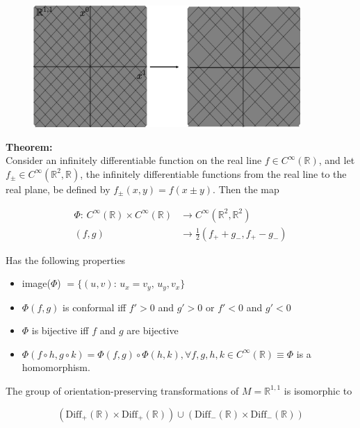 \begin{figure}[H]
	\centering
	\includegraphics[width=4in]{images/conf_trans_lightcone.png} 
\end{figure} 

\noindent \textbf{Theorem:} \\

\noindent Consider an infinitely differentiable function on the real line $f \in C^\infty (\mathbb{R})$, and let $f_\pm \in C^\infty (\mathbb{R}^2, \mathbb{R})$, the infinitely differentiable functions from the real line to the real plane, be defined by $f_\pm (x,y) = f(x \pm y)$. Then the map 

\begin{align}
\Phi: \, C^\infty (\mathbb{R}) \times C^\infty (\mathbb{R}) &\rightarrow C^\infty (\mathbb{R}^2, \mathbb{R}^2) \\
(f,g) &\rightarrow \frac{1}{2} (f_+ + g_-, f_+ - g_- )
\end{align}

\noindent Has the following properties

\begin{itemize}
\item image($\Phi$) $= \{ (u,v): \, u_x = v_y, \, u_y, v_x \}$
\item $\Phi(f,g)$ is conformal iff $f'>0$ and $g' >0$ or $f'<0$ and $g'<0$
\item $\Phi$ is bijective iff $f$ and $g$ are bijective
\item $\Phi(f \circ h, g \circ k) = \Phi(f,g) \circ \Phi (h,k), \forall f,g,h,k \in C^\infty(\mathbb{R}) \equiv \Phi$ is a homomorphism.
\end{itemize}

\noindent The group of orientation-preserving transformations of $M=\mathbb{R}^{1,1}$ is isomorphic to 

\begin{equation}
(\text{Diff}_+ (\mathbb{R}) \times \text{Diff}_+ (\mathbb{R})) \cup (\text{Diff}_- (\mathbb{R}) \times \text{Diff}_- (\mathbb{R}))
\end{equation}

